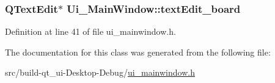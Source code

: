 \subsubsection[{\texorpdfstring{text\+Edit\+\_\+board}{textEdit_board}}]{\setlength{\rightskip}{0pt plus 5cm}Q\+Text\+Edit$\ast$ Ui\+\_\+\+Main\+Window\+::text\+Edit\+\_\+board}\hypertarget{class_ui___main_window_af13441b9fd874f1aeb2ec5cefaeb0bce}{}\label{class_ui___main_window_af13441b9fd874f1aeb2ec5cefaeb0bce}


Definition at line 41 of file ui\+\_\+mainwindow.\+h.



The documentation for this class was generated from the following file\+:\begin{DoxyCompactItemize}
\item 
src/build-\/qt\+\_\+ui-\/\+Desktop-\/\+Debug/\hyperlink{ui__mainwindow_8h}{ui\+\_\+mainwindow.\+h}\end{DoxyCompactItemize}
